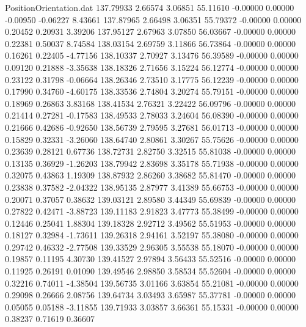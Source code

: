 \begin{filecontents}{PositionOrientation.dat}
 137.79933    2.66574    3.06851    55.11610   -0.00000    0.00000   -0.00950   -0.06227    8.43661
 137.87965    2.66498    3.06351    55.79372   -0.00000    0.00000    0.20452    0.20931    3.39206
 137.95127    2.67963    3.07850    56.03667   -0.00000    0.00000    0.22381    0.50037    8.74584
 138.03154    2.69759    3.11866    56.73864   -0.00000    0.00000    0.16261    0.22405   -4.77156
 138.10337    2.70927    3.13476    56.39589   -0.00000    0.00000    0.09120    0.21888   -3.35638
 138.18326    2.71656    3.15224    56.12774   -0.00000    0.00000    0.23122    0.31798   -0.06664
 138.26346    2.73510    3.17775    56.12239   -0.00000    0.00000    0.17990    0.34760   -4.60175
 138.33536    2.74804    3.20274    55.79151   -0.00000    0.00000    0.18969    0.26863    3.83168
 138.41534    2.76321    3.22422    56.09796   -0.00000    0.00000    0.21414    0.27281   -0.17583
 138.49533    2.78033    3.24604    56.08390   -0.00000    0.00000    0.21666    0.42686   -0.92650
 138.56739    2.79595    3.27681    56.01713   -0.00000    0.00000    0.15829    0.32331   -3.26060
 138.64740    2.80861    3.30267    55.75626   -0.00000    0.00000    0.23639    0.28121    0.67736
 138.72731    2.82750    3.32515    55.81038   -0.00000    0.00000    0.13135    0.36929   -1.26203
 138.79942    2.83698    3.35178    55.71938   -0.00000    0.00000    0.32075    0.43863    1.19309
 138.87932    2.86260    3.38682    55.81470   -0.00000    0.00000    0.23838    0.37582   -2.04322
 138.95135    2.87977    3.41389    55.66753   -0.00000    0.00000    0.20071    0.37057    0.38632
 139.03121    2.89580    3.44349    55.69839   -0.00000    0.00000    0.27822    0.42471   -3.88723
 139.11183    2.91823    3.47773    55.38499   -0.00000    0.00000    0.12446    0.25041    1.88304
 139.18328    2.92712    3.49562    55.51953   -0.00000    0.00000    0.18127    0.32984   -1.73611
 139.26318    2.94161    3.52197    55.38080   -0.00000    0.00000    0.29742    0.46332   -2.77508
 139.33529    2.96305    3.55538    55.18070   -0.00000    0.00000    0.19857    0.11195    4.30730
 139.41527    2.97894    3.56433    55.52516   -0.00000    0.00000    0.11925    0.26191    0.01090
 139.49546    2.98850    3.58534    55.52604   -0.00000    0.00000    0.32216    0.74011   -4.38504
 139.56735    3.01166    3.63854    55.21081   -0.00000    0.00000    0.29098    0.26666    2.08756
 139.64734    3.03493    3.65987    55.37781   -0.00000    0.00000    0.05055    0.05188   -3.11855
 139.71933    3.03857    3.66361    55.15331   -0.00000    0.00000    0.38237    0.71619    0.36607

\end{filecontents}
